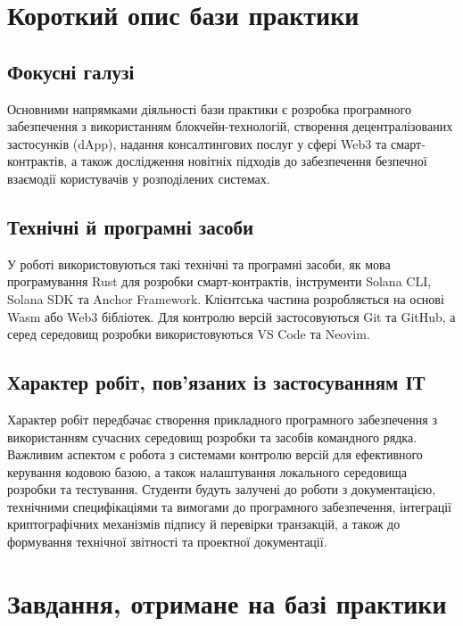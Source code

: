 \documentclass[14pt]{extreport}
\begin{document}
\setcounter{page}{2}
\tableofcontents
\newpage

\section{Короткий опис бази практики}

\subsection{Фокусні галузі}
Основними напрямками діяльності бази практики є розробка програмного забезпечення з використанням блокчейн-технологій, створення децентралізованих застосунків (dApp), надання консалтингових послуг у сфері Web3 та смарт-контрактів, а також дослідження новітніх підходів до забезпечення безпечної взаємодії користувачів у розподілених системах.

\subsection{Технічні й програмні засоби}
У роботі використовуються такі технічні та програмні засоби, як мова програмування Rust для розробки смарт-контрактів, інструменти Solana CLI, Solana SDK та Anchor Framework. Клієнтська частина розробляється на основі Wasm або Web3 бібліотек. Для контролю версій застосовуються Git та GitHub, а серед середовищ розробки використовуються VS Code та Neovim.

\subsection{Характер робіт, пов’язаних із застосуванням ІТ}
Характер робіт передбачає створення прикладного програмного забезпечення з використанням сучасних середовищ розробки та засобів командного рядка. Важливим аспектом є робота з системами контролю версій для ефективного керування кодовою базою, а також налаштування локального середовища розробки та тестування. Студенти будуть залучені до роботи з документацією, технічними специфікаціями та вимогами до програмного забезпечення, інтеграції криптографічних механізмів підпису й перевірки транзакцій, а також до формування технічної звітності та проектної документації.

\section{Завдання, отримане на базі практики}
\end{document}
